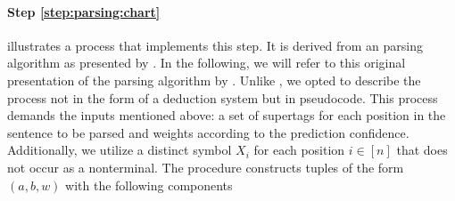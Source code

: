 \documentclass[../../document.tex]{subfiles}
\begin{document}
    \paragraph{Step \ref{step:parsing:chart}}
     illustrates a process that implements this step.
    It is derived from an  parsing algorithm as presented by \citet[the na\"ive algorithm in sec.~3]{Burden05}.
    In the following, we will refer to this original presentation of the parsing algorithm by .
    Unlike , we opted to describe the process not in the form of a deduction system but in pseudocode.
    This process demands the inputs mentioned above: a set of supertags for each position in the sentence to be parsed and weights according to the prediction confidence.
    Additionally, we utilize a distinct symbol \(X_i\) for each position \(i \in [n]\) that does not occur as a nonterminal.
    The procedure constructs tuples of the form \((a, b, w)\) with the following components
\end{document}
